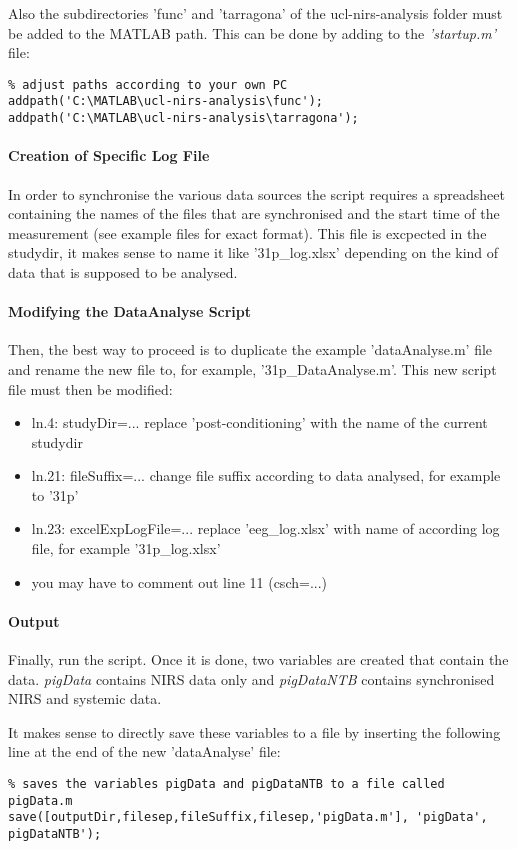 \documentclass[10pt]{article}
\begin{document}
Also the subdirectories 'func' and 'tarragona' of the ucl-nirs-analysis folder must be added to the MATLAB path. This can be done by adding to the \emph{'startup.m'} file:

\begin{lstlisting}
% adjust paths according to your own PC
addpath('C:\MATLAB\ucl-nirs-analysis\func');
addpath('C:\MATLAB\ucl-nirs-analysis\tarragona');
\end{lstlisting}

\paragraph*{Creation of Specific Log File}
In order to synchronise the various data sources the script requires a spreadsheet containing the names of the files that are synchronised and the start time of the measurement (see example files for exact format). 
This file is excpected in the studydir, it makes sense to name it like '31p\_log.xlsx' depending on the kind of data that is supposed to be analysed.

\paragraph{Modifying the DataAnalyse Script}
Then, the best way to proceed is to duplicate the example 'dataAnalyse.m' file and rename the new file to, for example, '31p\_DataAnalyse.m'. 
This new script file must then be modified:
\begin{itemize}
\item ln.4: studyDir=... replace 'post-conditioning' with the name of the current studydir
\item ln.21: fileSuffix=... change file suffix according to data analysed, for example to '31p'
\item ln.23: excelExpLogFile=... replace 'eeg\_log.xlsx' with name of according log file, for example '31p\_log.xlsx'
\item you may have to comment out line 11 (csch=...)
\end{itemize}

\paragraph{Output}
Finally, run the script. Once it is done, two variables are created that contain the data. \emph{pigData} contains NIRS data only and \emph{pigDataNTB} contains synchronised NIRS and systemic data. 

It makes sense to directly save these variables to a file by inserting the following line at the end of the new 'dataAnalyse' file:
\begin{lstlisting}
% saves the variables pigData and pigDataNTB to a file called pigData.m
save([outputDir,filesep,fileSuffix,filesep,'pigData.m'], 'pigData', pigDataNTB');
\end{lstlisting}
\end{document}
